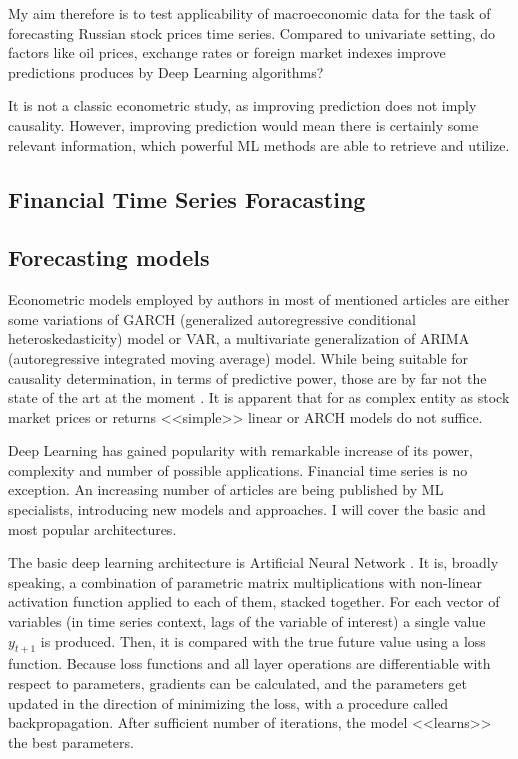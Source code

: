 \documentclass[stu]{apa7}
\begin{document}

My aim therefore is to test applicability of macroeconomic data for the task of forecasting Russian stock prices time series. Compared to univariate setting, do factors like oil prices, exchange rates or foreign market indexes improve predictions produces by Deep Learning algorithms?

It is not a classic econometric study, as improving prediction does not imply causality. However, improving prediction would mean there is certainly some relevant information, which powerful ML methods are able to retrieve and utilize.

\subsection{Financial Time Series Foracasting}



\subsection{Forecasting models}

Econometric models employed by authors in most of mentioned articles are either some variations of GARCH (generalized autoregressive conditional heteroskedasticity) model or VAR, a multivariate generalization of ARIMA (autoregressive integrated moving average) model. While being suitable for causality determination, in terms of predictive power, those are by far not the state of the art at the moment \citep{siami-namini_forecasting_2018}. It is apparent that for as complex entity as stock market prices or returns <<simple>> linear or ARCH models do not suffice.

Deep Learning has gained popularity with remarkable increase of its power, complexity and number of possible applications. Financial time series is no exception. An increasing number of articles are being published by ML specialists, introducing new models and approaches. I will cover the basic and most popular architectures.

The basic deep learning architecture is Artificial Neural Network \citep{sezer_financial_2019}. It is, broadly speaking, a combination of parametric matrix multiplications with non-linear activation function applied to each of them, stacked together. For each vector of variables (in time series context, lags of the variable of interest) a single value $y_{t+1}$ is produced. Then, it is compared with the true future value using a loss function. Because loss functions and all layer operations are differentiable with respect to parameters, gradients can be calculated, and the parameters get updated in the direction of minimizing the loss, with a procedure called backpropagation. After sufficient number of iterations, the model <<learns>> the best parameters.
\end{document}
